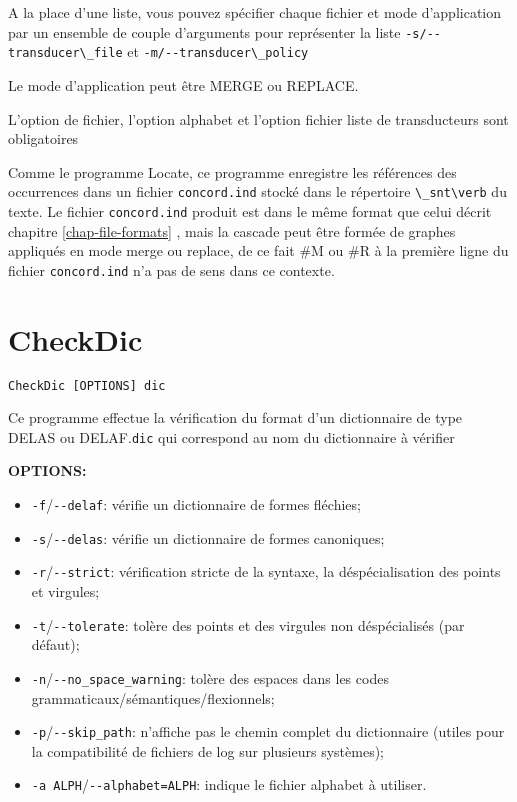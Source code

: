 \bigskip
\noindent A la place d'une liste, vous pouvez spécifier chaque fichier et mode d'application par un
ensemble de couple d'arguments pour représenter la liste \verb+-s/--transducer\_file+ et
\verb+-m/--transducer\_policy+ 
      
\bigskip
\noindent Le mode d'application peut être MERGE ou REPLACE.
      
\bigskip
\noindent L'option de fichier, l'option alphabet et l'option fichier liste de transducteurs sont
obligatoires
     
\bigskip
\noindent Comme le programme Locate, ce programme enregistre les références des occurrences dans un
fichier \verb+concord.ind+ stocké dans le répertoire \verb+\_snt\verb+ du texte.
Le fichier \verb+concord.ind+ produit est dans le même format que celui décrit chapitre
\ref{chap-file-formats} , mais la cascade peut être formée de graphes appliqués en mode merge ou
replace, de ce fait \#M ou \#R à la première ligne du fichier \verb+concord.ind+ n'a pas de sens dans ce contexte.



\section{CheckDic}
\verb+CheckDic [OPTIONS] dic+

\bigskip
\noindent Ce programme effectue la vérification du format d’un dictionnaire de type DELAS ou
DELAF.\verb+dic+ qui correspond au nom du dictionnaire à vérifier

\bigskip
\noindent \textbf{OPTIONS:}
\begin{itemize}
\item \verb+-f+/\verb+--delaf+: vérifie un dictionnaire de formes fléchies;
\item \verb+-s+/\verb+--delas+: vérifie un dictionnaire de formes canoniques;
\item \verb+-r+/\verb+--strict+: vérification stricte de la syntaxe, la déspécialisation des points
	et virgules;
\item \verb+-t+/\verb+--tolerate+: tolère des points et des virgules non déspécialisés (par défaut);
\item \verb+-n+/\verb+--no_space_warning+: tolère des espaces dans les codes
	grammaticaux/sémantiques/flexionnels;
\item \verb+-p+/\verb+--skip_path+: n'affiche pas le chemin complet du dictionnaire (utiles pour la
		compatibilité de fichiers de log sur plusieurs systèmes);
\item \verb+-a ALPH+/\verb+--alphabet=ALPH+: indique le fichier alphabet à utiliser. 
\end{itemize}

